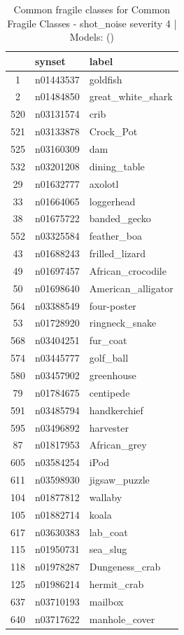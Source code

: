 \begin{table}
\caption{Common fragile classes for Common Fragile Classes - shot_noise severity 4 | Models: ()}
\label{tab:Common Fragile Classes - shot_noise severity 4_d41d8cd9}
\begin{tabular}{cll}
\toprule
 & synset & label \\
\midrule
1 & n01443537 & goldfish \\
2 & n01484850 & great_white_shark \\
520 & n03131574 & crib \\
521 & n03133878 & Crock_Pot \\
525 & n03160309 & dam \\
532 & n03201208 & dining_table \\
29 & n01632777 & axolotl \\
33 & n01664065 & loggerhead \\
38 & n01675722 & banded_gecko \\
552 & n03325584 & feather_boa \\
43 & n01688243 & frilled_lizard \\
49 & n01697457 & African_crocodile \\
50 & n01698640 & American_alligator \\
564 & n03388549 & four-poster \\
53 & n01728920 & ringneck_snake \\
568 & n03404251 & fur_coat \\
574 & n03445777 & golf_ball \\
580 & n03457902 & greenhouse \\
79 & n01784675 & centipede \\
591 & n03485794 & handkerchief \\
595 & n03496892 & harvester \\
87 & n01817953 & African_grey \\
605 & n03584254 & iPod \\
611 & n03598930 & jigsaw_puzzle \\
104 & n01877812 & wallaby \\
105 & n01882714 & koala \\
617 & n03630383 & lab_coat \\
115 & n01950731 & sea_slug \\
118 & n01978287 & Dungeness_crab \\
125 & n01986214 & hermit_crab \\
637 & n03710193 & mailbox \\
640 & n03717622 & manhole_cover \\

\end{tabular}
\end{table}
